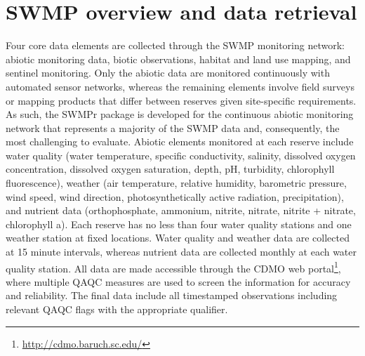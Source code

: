 \documentclass[10pt,letterpaper]{article}\usepackage[]{graphicx}\usepackage[]{color}
\begin{document}
\section*{SWMP overview and data retrieval}

Four core data elements are collected through the \ac{SWMP} monitoring network: abiotic monitoring data, biotic observations, habitat and land use mapping, and sentinel monitoring.  Only the abiotic data are monitored continuously with automated sensor networks, whereas the remaining elements involve field surveys or mapping products that differ between reserves given site-specific requirements.  As such, the SWMPr package is developed for the continuous abiotic monitoring network that represents a majority of the \ac{SWMP} data and, consequently, the most challenging to evaluate.  Abiotic elements monitored at each reserve include water quality (water temperature, specific conductivity, salinity, dissolved oxygen concentration, dissolved oxygen saturation, depth, pH, turbidity, chlorophyll fluorescence), weather (air temperature, relative humidity, barometric pressure, wind speed, wind direction, photosynthetically active radiation, precipitation), and nutrient data (orthophosphate, ammonium, nitrite, nitrate, nitrite + nitrate, chlorophyll a).  Each reserve has no less than four water quality stations and one weather station at fixed locations.  Water quality and weather data are collected at 15 minute intervals, whereas nutrient data are collected monthly at each water quality station.  All data are made accessible through the \ac{CDMO} web portal\footnote{\url{http://cdmo.baruch.sc.edu/}}, where multiple \ac{QAQC} measures are used to screen the information for accuracy and reliability.  The final data include all timestamped observations including relevant \ac{QAQC} flags with the appropriate qualifier.
\end{document}

